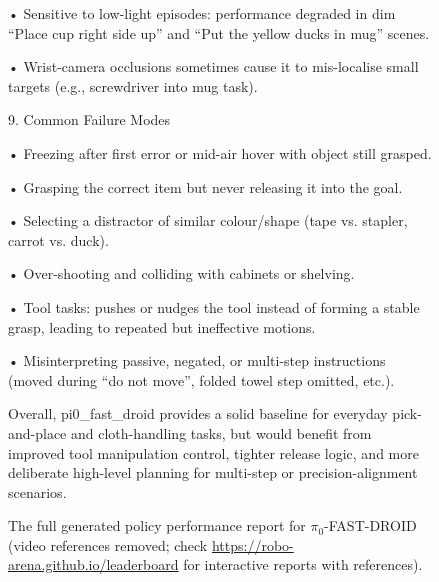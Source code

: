 \begin{figure}[ht!]
{\begin{minipage}{\linewidth}
• Sensitive to low-light episodes: performance degraded in dim “Place cup right side up” and “Put the yellow ducks in mug” scenes.  \par
• Wrist-camera occlusions sometimes cause it to mis-localise small targets (e.g., screwdriver into mug task). \par
\vspace{1em}
9. Common Failure Modes  \par
• Freezing after first error or mid-air hover with object still grasped. \par  
• Grasping the correct item but never releasing it into the goal.  \par
• Selecting a distractor of similar colour/shape (tape vs. stapler, carrot vs. duck). \par  
• Over-shooting and colliding with cabinets or shelving.  \par
• Tool tasks: pushes or nudges the tool instead of forming a stable grasp, leading to repeated but ineffective motions.  \par
• Misinterpreting passive, negated, or multi-step instructions (moved during “do not move”, folded towel step omitted, etc.). \par
\vspace{1em}
Overall, pi0\_fast\_droid provides a solid baseline for everyday pick-and-place and cloth-handling tasks, but would benefit from improved tool manipulation control, tighter release logic, and more deliberate high-level planning for multi-step or precision-alignment scenarios.
\end{minipage}
}
\caption{The full generated policy performance report for $\pi_0$-FAST-DROID (video references removed; check \href{https://robo-arena.github.io/leaderboard}{https://robo-arena.github.io/leaderboard} for interactive reports with references).}
\label{figure:pi0_fast_droid_full_performance_report}
\end{figure}



